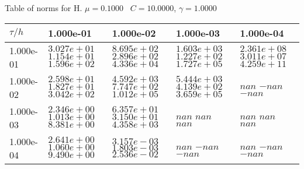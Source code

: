 \begin{center}
Table of norms for H. $\mu = 0.1000$ \, $C = 10.0000$, $\gamma = 1.0000$
  
\begin{tabular}{|p{1in}|p{1in}|p{1in}|p{1in}|p{1in}|} \hline
$\tau / h$ &1.000e-01 &1.000e-02 &1.000e-03 &1.000e-04 \\ \hline 
1.000e-01 & $3.027e+01$  $1.154e+01$  $1.596e+02$  & $8.695e+02$  $2.896e+02$  $4.336e+04$  & $1.603e+03$  $1.227e+02$  $1.727e+05$  & $2.361e+08$  $3.011e+07$  $4.259e+11$  \\ \hline 
1.000e-02 & $2.598e+01$  $1.827e+01$  $3.042e+02$  & $4.592e+03$  $7.747e+02$  $1.012e+05$  & $5.444e+03$  $4.139e+02$  $3.659e+05$  & $nan$  $-nan$  $-nan$  \\ \hline 
1.000e-03 & $2.346e+00$  $1.013e+00$  $8.381e+00$  & $6.357e+01$  $3.150e+01$  $4.358e+03$  & $nan$  $nan$  $nan$  & $nan$  $nan$  $nan$  \\ \hline 
1.000e-04 & $2.641e+00$  $1.060e+00$  $9.490e+00$  & $3.157e-03$  $1.803e-03$  $2.536e-02$  & $nan$  $-nan$  $-nan$  & $nan$  $-nan$  $-nan$  \\ \hline 

\end{tabular}\\[20pt]
\end{center}
